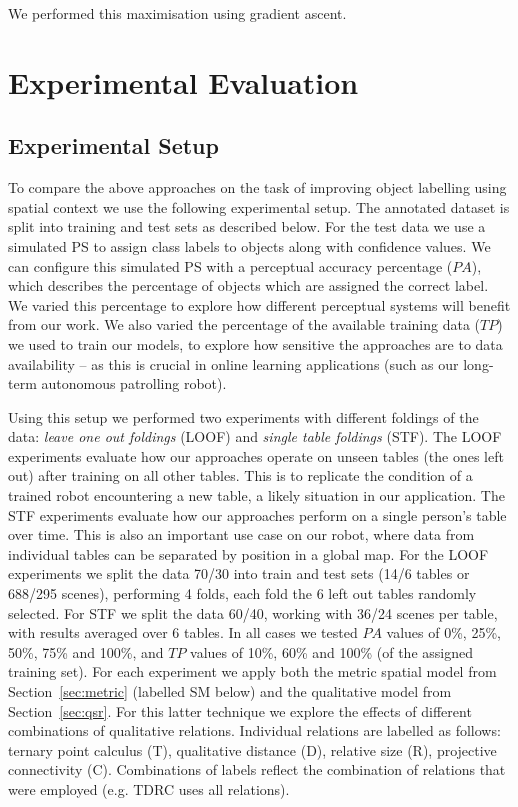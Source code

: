 \documentclass[letterpaper]{article}
\begin{document}
\noindent We performed this maximisation using gradient ascent.

\section{Experimental Evaluation}
\label{Experimental Evaluation}

\subsection{Experimental Setup}
\label{Experimental Setup}

To compare the above approaches on the task of improving object labelling using spatial context we use the following experimental setup. The annotated dataset is split into training and test sets as described below. For the test data we use a simulated PS to assign class labels to objects along with confidence values. We can configure this simulated PS with a perceptual accuracy percentage ($PA$), which describes the percentage of objects which are assigned the correct label. We varied this percentage to explore how different perceptual systems will benefit from our work. We also varied the percentage of the available training data ($TP$) we used to train our models, to explore how sensitive the approaches are to data availability -- as this is crucial in online learning applications (such as our long-term autonomous patrolling robot).

Using this setup we performed two experiments with different foldings of the data: \textit{leave one out foldings} (LOOF) and \textit{single table foldings} (STF). The LOOF experiments evaluate how our approaches operate on unseen tables (the ones left out) after training on all other tables. This is to replicate the condition of a trained robot encountering a new table, a likely situation in our application. The STF experiments evaluate how our approaches perform on a single person's table over time. This is also an important use case on our robot, where data from individual tables can be separated by position in a global map. For the LOOF experiments we split the data 70/30 into train and test sets (14/6 tables or 688/295 scenes), performing 4 folds, each fold the 6 left out tables randomly selected. For STF we split the data 60/40, working with 36/24 scenes per table, with results averaged over 6 tables. In all cases we tested $PA$ values of 0\%, 25\%, 50\%, 75\% and 100\%, and $TP$ values of 10\%, 60\% and 100\% (of the assigned training set). For each experiment we apply both the metric spatial model from Section~\ref{sec:metric} (labelled SM below) and the qualitative model from Section~\ref{sec:qsr}. For this latter technique we explore the effects of different combinations of qualitative relations. Individual relations are labelled as follows: ternary point calculus (T), qualitative distance (D), relative size (R), projective connectivity (C). Combinations of labels reflect the combination of relations that were employed (e.g. TDRC uses all relations).
\end{document}
